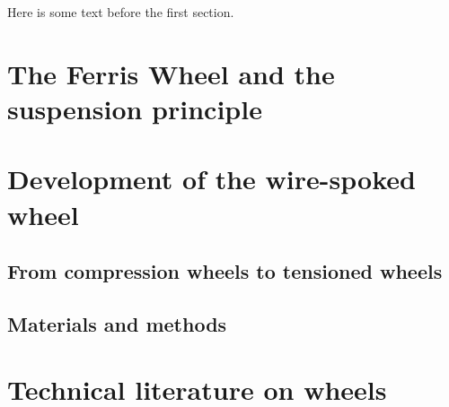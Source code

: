\documentclass[../thesis.tex]{subfiles}
\begin{document}
Here is some text before the first section.
\section{The Ferris Wheel and the suspension principle}

\section{Development of the wire-spoked wheel}
\subsection{From compression wheels to tensioned wheels}
\subsection{Materials and methods}

\section{Technical literature on wheels}
\end{document}
